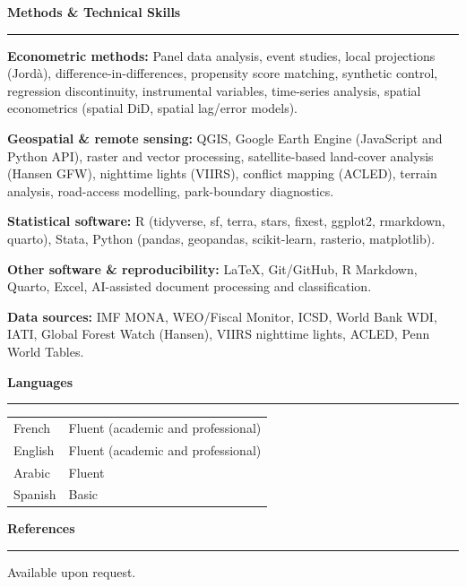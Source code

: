 \documentclass[10pt,a4paper]{article}
\newcommand{\cvsection}[1]{%
  \vspace{9pt}\noindent%
  {\normalsize\bfseries\color{navy}#1}%
  \par\nointerlineskip\vspace{2pt}%
  {\color{gold}\rule{\linewidth}{0.9pt}}%
  \par\vspace{3pt}%
}
\begin{document}
\cvsection{Methods \& Technical Skills}

\textbf{Econometric methods:}
Panel data analysis, event studies, local projections (Jord\`{a}),
difference-in-differences, propensity score matching, synthetic control,
regression discontinuity, instrumental variables, time-series analysis,
spatial econometrics (spatial DiD, spatial lag/error models).

\textbf{Geospatial \& remote sensing:}
QGIS, Google Earth Engine (JavaScript and Python API),
raster and vector processing, satellite-based land-cover analysis (Hansen GFW),
nighttime lights (VIIRS), conflict mapping (ACLED), terrain analysis,
road-access modelling, park-boundary diagnostics.

\textbf{Statistical software:}
R (tidyverse, sf, terra, stars, fixest, ggplot2, rmarkdown, quarto),
Stata, Python (pandas, geopandas, scikit-learn, rasterio, matplotlib).

\textbf{Other software \& reproducibility:}
\LaTeX, Git/GitHub, R Markdown, Quarto, Excel,
AI-assisted document processing and classification.

\textbf{Data sources:}
IMF MONA, WEO/Fiscal Monitor, ICSD, World Bank WDI, IATI,
Global Forest Watch (Hansen), VIIRS nighttime lights, ACLED, Penn World Tables.

\cvsection{Languages}

\begin{tabular}{@{}ll@{}}
French  & Fluent (academic and professional)\\[2pt]
English & Fluent (academic and professional)\\[2pt]
Arabic  & Fluent\\[2pt]
Spanish & Basic\\
\end{tabular}

\cvsection{References}

Available upon request.
\end{document}
